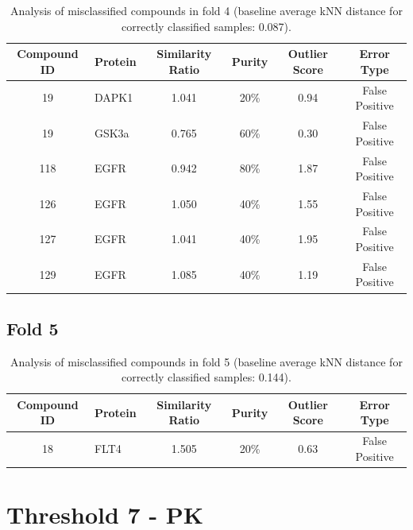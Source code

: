 \documentclass{article}
\newenvironment{smarttabular}[1]{%
    \begin{tabular}{#1}%
}{%
    \end{tabular}%
}
\begin{document}
\begin{table}[H]
    \centering
    \small
    \caption{Analysis of misclassified compounds in fold 4 (baseline average kNN distance for correctly classified samples: 0.087).}
    \label{tab:misclassified_compounds_4}
    \begin{smarttabular}{clcccc}
        \toprule
        \textbf{Compound ID} & \textbf{Protein} & \textbf{Similarity Ratio} & \textbf{Purity} & \textbf{Outlier Score} & \textbf{Error Type} \\
        \midrule
        19 & DAPK1 & 1.041 & 20\% & 0.94 & False Positive \\
        19 & GSK3a & 0.765 & 60\% & 0.30 & False Positive \\
        118 & EGFR & 0.942 & 80\% & 1.87 & False Positive \\
        126 & EGFR & 1.050 & 40\% & 1.55 & False Positive \\
        127 & EGFR & 1.041 & 40\% & 1.95 & False Positive \\
        129 & EGFR & 1.085 & 40\% & 1.19 & False Positive \\
        \bottomrule
    \end{smarttabular}
\end{table}

\clearpage

\subsection{Fold 5}

\begin{table}[H]
    \centering
    \small
    \caption{Analysis of misclassified compounds in fold 5 (baseline average kNN distance for correctly classified samples: 0.144).}
    \label{tab:misclassified_compounds_5}
    \begin{smarttabular}{clcccc}
        \toprule
        \textbf{Compound ID} & \textbf{Protein} & \textbf{Similarity Ratio} & \textbf{Purity} & \textbf{Outlier Score} & \textbf{Error Type} \\
        \midrule
        18 & FLT4 & 1.505 & 20\% & 0.63 & False Positive \\
        \bottomrule
    \end{smarttabular}
\end{table}

\clearpage

\section{Threshold 7 - PK}
\end{document}
